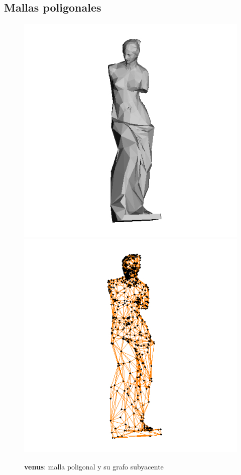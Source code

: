 \documentclass[conference,compsoc,a4paper]{IEEEtran}
\begin{document}
\subsection{Mallas poligonales}

\begin{figure}
	\includegraphics[scale=.21]{venusv_solid.jpg} %
	\includegraphics[scale=.21]{venusv_graph.jpg} %
	\caption{\textbf{venus}: malla poligonal y su grafo subyacente}%
	\label{fig:venus} %
\end{figure}
\end{document}
